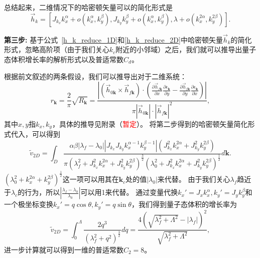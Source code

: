 			总结起来，二维情况下的哈密顿矢量可以的简化形式是
			\begin{equation} \label{h_k_reduce_2D}
				\vec{h}_k = [J_{k_x} k_x^{\alpha} + o(k_x^{\alpha} ,k_y^{\beta}), J_{k_y} k_y^{\beta} + o(k_x^{\alpha} ,k_y^{\beta}), \lambda + o(k_x^{2\alpha} ,k_y^{2\beta})].
			\end{equation}
		
			{\bf 第三步:}
			基于公式~\eqref{h_k_reduce_1D}和\eqref{h_k_reduce_2D}中哈密顿矢量$\vec{h}_k$的简化形式，忽略高阶项（由于我们关心$k_c$附近的小邻域）之后，我们就可以推导出量子态体积增长率的解析形式以及普适常数$C_d$。
			
			根据前文叙述的两条假设，我们可以推导出对于二维系统：
			\begin{equation} \label{Eq:rk_2D}
				r_\mathbf{k} = \frac2\pi \sqrt{R_\mathbf{k}} =\frac{\left|({\vec{h}}_{0\mathbf{k}} \times {\vec{h}}_{f\mathbf{k}}) \cdot (\frac{\partial {\vec{h}}_{f\mathbf{k}}}{\partial x} \frac{\partial \epsilon_\mathbf{k}}{\partial y} - \frac{\partial {\vec{h}}_{f\mathbf{k}}}{\partial y} \frac{\partial \epsilon_\mathbf{k}}{\partial x})\right|}{\pi|{\vec{h}}_{0\mathbf{k}}| \cdot |{\vec{h}}_{f\mathbf{k}}|^2},
			\end{equation}
			其中$x, y$指$k_x, k_y$，具体的推导见附录（\textcolor{red}{暂定}）。
			将第二步得到的哈密顿矢量简化形式代入，可以得到
			\begin{equation}
				\tilde{v}_{2D} = \int_{D}{\frac{\alpha \beta |\lambda_f-\lambda_0||J_{k_x}J_{k_y}k_x^{\alpha-1} k_y^{\beta-1}|(J_{k_x}^2k_x^{2\alpha}+J_{k_y}^2k_y^{2\beta})}{\pi(\lambda_f^2+J_{k_x}^2k_x^{2\alpha}+J_{k_y}^2k_y^{2\beta})^{\frac32}(\lambda_0^2+J_{k_x}^2k_x^{2\alpha}+J_{k_y}^2k_y^{2\beta})^{\frac12}} d\mathbf{k}}.
			\end{equation}
			$(\lambda_0^2+k_x^{2\alpha}+k_y^{2\beta})^{\frac12}$这一项可以用其在$\mathbf{k}_c$处的值$|\lambda_0|$来代替。
			由于我们关心$\lambda_f$趋近于$\lambda_c$的行为，所以$|\frac{\lambda_f-\lambda_0}{\lambda_0}|$可以用1来代替。
			通过变量代换$k_x'=J_x k_x^\alpha,k_y'=J_y k_y^\beta$和一个极坐标变换$k_x'=q\cos{\theta},k_y'=q\sin{\theta}$，我们得到量子态体积的增长率为
			\begin{equation}
				\tilde{v}_{2D} = \int_{0}^{\Lambda}{\frac{2q^3}{(\lambda_f^2+q^2)^\frac32}}dq
				= \frac{4(\sqrt{\lambda_f^2+\Lambda^2}-|\lambda_f|)^2}{\sqrt{\lambda_f^2+\Lambda^2}},
			\end{equation}
			进一步计算就可以得到一维的普适常数$C_2=8$。			
			
